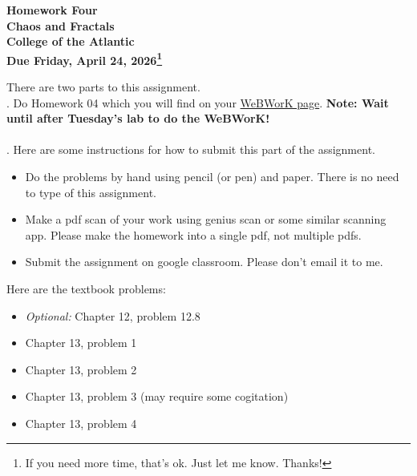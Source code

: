 \documentclass[14pt]{extarticle}
\begin{document}
\pagestyle{empty}
 
\begin{center}
{\LARGE {\bf Homework Four}}\\
\bigskip
{\Large {\bf Chaos and Fractals}}\\
\bigskip
{\Large {\bf College of the Atlantic}}\\
\bigskip
{ {\bf Due Friday, April 24, 2026\footnote{If you need more time,
      that's ok. Just let me know. Thanks!}}}\\  
\end{center}
\medskip


\noindent There are two parts to this assignment.\\

.  Do Homework 04 which you will find
on your
\href{https://webwork-hosting.runestone.academy/webwork2/coa-feldman-es1026i-spring2026}{WeBWorK 
  page}. \textbf{Note: Wait until after Tuesday's lab to do the WeBWorK!}\\ 

\hspace{2mm}\\

.  Here are some
instructions for how to submit this part of the assignment.
\begin{itemize}
\item Do the problems by hand using pencil (or pen) and paper.
  There is no need to type of this assignment.
\item Make a pdf scan of your work using genius scan or some
  similar scanning app. Please make the homework into a single
  pdf, not multiple pdfs.
\item Submit the assignment on google classroom.  Please don't
  email it to me. 
\end{itemize}

\noindent Here are the textbook problems:

\begin{itemize}
  \setlength{\itemsep}{-1mm}
  \item \textit{Optional:} Chapter 12, problem 12.8
  \item Chapter 13, problem 1
  \item Chapter 13, problem 2
  \item Chapter 13, problem 3 (may require some cogitation)
  \item Chapter 13, problem 4
\end{itemize}


\end{document}
